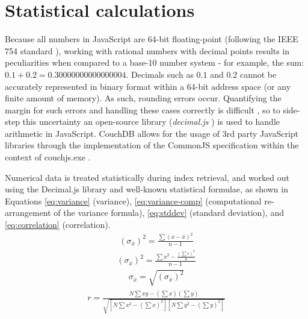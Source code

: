 \section{Statistical calculations}
Because all numbers in JavaScript are 64-bit floating-point (following the IEEE 754 standard \cite{floatingPoint}), working with rational numbers with decimal points results in peculiarities when compared to a base-10 number system - for example, the sum: $0.1 + 0.2 = 0.30000000000000004$. Decimals such as $0.1$ and $0.2$ cannot be accurately represented in binary format within a 64-bit address space (or any finite amount of memory). As such, rounding errors occur. Quantifying the margin for such errors and handling these cases correctly is difficult \cite{Goldberg1991}, so to side-step this uncertainty an open-source library (\textit{decimal.js} \cite{decimaljs}) is used to handle arithmetic in JavaScript. CouchDB allows for the usage of 3rd party JavaScript libraries through the implementation of the CommonJS specification within the context of couchjs.exe \cite{commonJsMapFn}.

Numerical data is treated statistically during index retrieval, and worked out using the Decimal.js library and well-known statistical formulae, as shown in Equations \ref{eq:variance} (variance), \ref{eq:variance-comp} (computational re-arrangement of the variance formula), \ref{eq:stddev} (standard deviation), and \ref{eq:correlation} (correlation).
\begin{align}
  (\sigma_{\overline{x}})^{2} = \frac{\sum{(x-\bar{x})^2}}{n-1}\label{eq:variance}
\end{align}
\begin{align}
  (\sigma_{\overline{x}})^{2} =  \frac{\sum{x^2} - \frac{(\sum{x})^2}{n}}{n - 1}\label{eq:variance-comp}
\end{align}
\begin{align}
  \sigma_{\overline{x}} = \sqrt{(\sigma_{\overline{x}})^{2}}\label{eq:stddev}
\end{align}
\begin{align}
  r = \frac{N\sum{xy} - (\sum{x})(\sum{y})}{\sqrt{[N\sum{x^2} - (\sum{x})^2][N\sum{y^2} - (\sum{y})^2]}} \label{eq:correlation}
\end{align}
